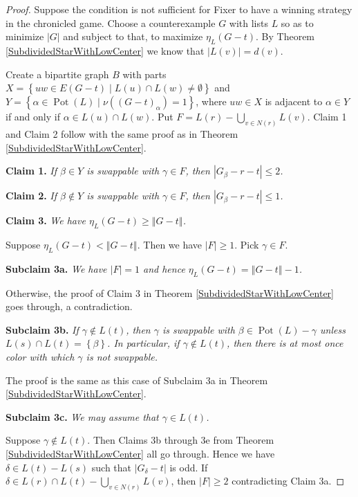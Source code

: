\documentclass[12pt,reqno]{amsart}
\theoremstyle{plain}
\theoremstyle{definition}
\theoremstyle{remark}
\newcommand{\set}[1]{\left\{ #1 \right\}}
\newcommand{\setb}[3]{\left\{ #1 \in #2 \mid #3 \right\}}
\newcommand{\card}[1]{\left|#1\right|}
\newcommand{\size}[1]{\left\Vert#1\right\Vert}
\newcommand{\pot}{\operatorname{Pot}}
\begin{document}
\begin{proof}
Suppose the condition is not sufficient for Fixer to have a winning strategy in the chronicled game.  Choose a counterexample $G$ with lists $L$ so as to minimize $\card{G}$ and subject to that, to maximize $\eta_L(G - t)$.
By Theorem \ref{SubdividedStarWithLowCenter} we know that $\card{L(v)} = d(v)$.

Create a bipartite graph $B$ with parts $X = \setb{uw}{E(G - t)}{L(u) \cap L(w) \ne \emptyset}$ and $Y = \setb{\alpha}{\pot(L)}{\nu((G - t)_\alpha) = 1}$, where $uw \in X$ is adjacent to $\alpha \in Y$ if and only if $\alpha \in L(u) \cap L(w)$.  Put $F = L(r) - \bigcup_{v \in N(r)} L(v)$.  Claim 1 and Claim 2 follow with the same proof as in Theorem \ref{SubdividedStarWithLowCenter}.

\noindent\textbf{Claim 1.  }\textit{If $\beta \in Y$ is swappable with $\gamma \in F$, then $\card{G_\beta - r - t} \le 2$.}

\noindent\textbf{Claim 2.  }\textit{If $\beta \not \in Y$ is swappable with $\gamma \in F$, then $\card{G_\beta - r - t} \le 1$.}

\noindent\textbf{Claim 3.  }\textit{We have $\eta_L(G - t) \ge \size{G - t}$.}

Suppose $\eta_L(G - t) < \size{G - t}$. Then we have $\card{F} \ge 1$.  Pick $\gamma \in F$.

\noindent\textbf{Subclaim 3a.  }\textit{We have $\card{F} = 1$ and hence $\eta_L(G - t) = \size{G - t} - 1$.}

Otherwise, the proof of Claim 3 in Theorem \ref{SubdividedStarWithLowCenter} goes through, a contradiction.

\noindent\textbf{Subclaim 3b.  }\textit{If $\gamma \not \in L(t)$, then $\gamma$ is swappable with $\beta \in \pot(L) - \gamma$ unless $L(s) \cap L(t) = \set{\beta}$.  In particular, if $\gamma \not \in L(t)$, then there is at most once color with which $\gamma$ is not swappable.}

The proof is the same as this case of Subclaim 3a in Theorem \ref{SubdividedStarWithLowCenter}.

\noindent\textbf{Subclaim 3c.  }\textit{We may assume that $\gamma \in L(t)$.}

Suppose $\gamma \not \in L(t)$.  Then Claims 3b through 3e from Theorem \ref{SubdividedStarWithLowCenter} all go through.  Hence we have $\delta \in L(t) - L(s)$ such that $\card{G_\delta - t}$ is odd.  If $\delta \in L(r) \cap L(t) - \bigcup_{v \in N(r)} L(v)$, then $\card{F} \ge 2$ contradicting Claim 3a.


\end{proof}
\end{document}
